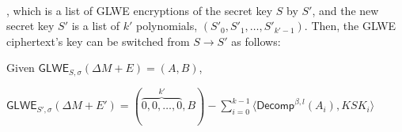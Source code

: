 $ $

\noindent , which is a list of GLWE encryptions of the secret key $S$ by $S'$, and the new secret key $S'$ is a list of $k'$ polynomials, $(S'_0, S'_1, \ldots, S'_{k'-1})$. Then, the GLWE ciphertext's key can be switched from $S \rightarrow S'$ as follows: 


\begin{tcolorbox}[title={\textbf{\tboxlabel{\ref*{sec:glwe-key-switching}} GLWE Key Switching}}]

Given $\textsf{GLWE}_{S,\sigma}(\Delta M + E) = (A, B)$,

$\textsf{GLWE}_{S',\sigma}(\Delta M + E') = (\overbrace{0, 0, \ldots, 0}^{k'}, B) - \sum \limits_{i=0}^{k-1} \langle \textsf{Decomp}^{\beta, l}(A_i), \mathit{KSK}_i \rangle$
\end{tcolorbox}




